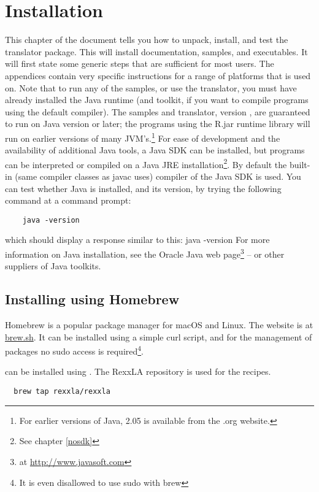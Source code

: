 \chapter{Installation}
This chapter of the document tells you how to unpack, install, and test the \nr{} translator package. This will install documentation, samples, and executables. It will first state some generic steps that are sufficient for most users. The appendices contain very specific instructions for a range of platforms that \nr{} is used on. 
Note that to run any of the samples, or use the \nr{} translator, you must have already installed the Java runtime (and toolkit, if you want to compile \nr{} programs using the default compiler). 
The \nr{} samples and translator, version , are
guaranteed to run on Java version \minimalJVMversion{} or later; the programs using the
\nr{}R.jar runtime library will run on earlier versions of many JVM's.\footnote{For earlier versions of Java,
  \nr{} 2.05 is available from the \nr{}.org website.} For ease
of development and the availability of additional Java tools, a Java
SDK can be installed, but \nr{}
programs can be interpreted or compiled on a Java JRE
installation\footnote{See chapter \ref{nosdk}}. By
default the built-in (same compiler classes as javac uses) compiler of the Java SDK is used. You can test whether Java is installed, and its version, by trying the following command at a command prompt:
\begin{lstlisting} 
    java -version
\end{lstlisting}
which should display a response similar to this:
\bash[stderr]
java -version
\END
For more information on Java installation, see the Oracle Java web page\footnote{at \url{http://www.javasoft.com}} – or other suppliers of Java toolkits.

\section{Installing using Homebrew}

Homebrew is a popular package manager for macOS and Linux. The website
is at \url{brew.sh}. It can be installed using a simple curl script,
and for the management of packages no sudo access is
required\footnote{It is even disallowed to use sudo with brew}.

\nr{} can be installed using . The RexxLA repository is
used for the \nr{} recipes.

\begin{lstlisting}
  brew tap rexxla/rexxla
\end{lstlisting}

